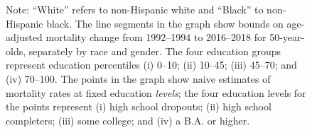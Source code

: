 \begin{landscape}
\begin{figure}[H]
\begin{center}
\begin{tabular}{cc}
    \end{tabular}
    
  \end{center}
  \footnotesize{Note: ``White'' refers to non-Hispanic white and ``Black'' to non-Hispanic black. The line segments in the graph show bounds on age-adjusted mortality change from 1992--1994 to 2016--2018 for 50-year-olds, separately by race and gender. The four education groups represent education percentiles (i) 0--10; (ii) 10--45; (iii) 45--70; and (iv) 70--100.  The points in the graph show naive estimates of mortality rates at fixed education \textit{levels}; the four education levels for the points represent (i) high school dropouts; (ii) high school completers; (iii) some college; and (iv) a B.A. or higher.}
\end{figure}
\end{landscape}

